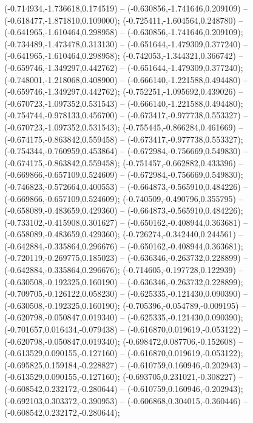  (-0.714934,-1.736618,0.174519) -- (-0.630856,-1.741646,0.209109) -- (-0.618477,-1.871810,0.109000);
 (-0.725411,-1.604564,0.248780) -- (-0.641965,-1.610464,0.298958) -- (-0.630856,-1.741646,0.209109);
 (-0.734489,-1.473478,0.313130) -- (-0.651644,-1.479309,0.377240) -- (-0.641965,-1.610464,0.298958);
 (-0.742053,-1.344321,0.366742) -- (-0.659746,-1.349297,0.442762) -- (-0.651644,-1.479309,0.377240);
 (-0.748001,-1.218068,0.408900) -- (-0.666140,-1.221588,0.494480) -- (-0.659746,-1.349297,0.442762);
 (-0.752251,-1.095692,0.439026) -- (-0.670723,-1.097352,0.531543) -- (-0.666140,-1.221588,0.494480);
 (-0.754744,-0.978133,0.456700) -- (-0.673417,-0.977738,0.553327) -- (-0.670723,-1.097352,0.531543);
 (-0.755445,-0.866284,0.461669) -- (-0.674175,-0.863842,0.559458) -- (-0.673417,-0.977738,0.553327);
 (-0.754344,-0.760959,0.453864) -- (-0.672984,-0.756669,0.549830) -- (-0.674175,-0.863842,0.559458);
 (-0.751457,-0.662882,0.433396) -- (-0.669866,-0.657109,0.524609) -- (-0.672984,-0.756669,0.549830);
 (-0.746823,-0.572664,0.400553) -- (-0.664873,-0.565910,0.484226) -- (-0.669866,-0.657109,0.524609);
 (-0.740509,-0.490796,0.355795) -- (-0.658089,-0.483659,0.429360) -- (-0.664873,-0.565910,0.484226);
 (-0.733102,-0.415908,0.301627) -- (-0.650162,-0.408944,0.363681) -- (-0.658089,-0.483659,0.429360);
 (-0.726274,-0.342440,0.244561) -- (-0.642884,-0.335864,0.296676) -- (-0.650162,-0.408944,0.363681);
 (-0.720119,-0.269775,0.185023) -- (-0.636346,-0.263732,0.228899) -- (-0.642884,-0.335864,0.296676);
 (-0.714605,-0.197728,0.122939) -- (-0.630508,-0.192325,0.160190) -- (-0.636346,-0.263732,0.228899);
 (-0.709705,-0.126122,0.058230) -- (-0.625335,-0.121430,0.090390) -- (-0.630508,-0.192325,0.160190);
 (-0.705396,-0.054789,-0.009195) -- (-0.620798,-0.050847,0.019340) -- (-0.625335,-0.121430,0.090390);
 (-0.701657,0.016434,-0.079438) -- (-0.616870,0.019619,-0.053122) -- (-0.620798,-0.050847,0.019340);
 (-0.698472,0.087706,-0.152608) -- (-0.613529,0.090155,-0.127160) -- (-0.616870,0.019619,-0.053122);
 (-0.695825,0.159184,-0.228827) -- (-0.610759,0.160946,-0.202943) -- (-0.613529,0.090155,-0.127160);
 (-0.693705,0.231021,-0.308227) -- (-0.608542,0.232172,-0.280644) -- (-0.610759,0.160946,-0.202943);
 (-0.692103,0.303372,-0.390953) -- (-0.606868,0.304015,-0.360446) -- (-0.608542,0.232172,-0.280644);
